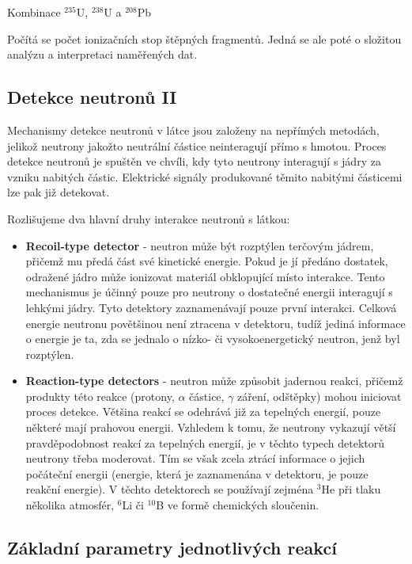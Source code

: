 \documentclass[../../main.tex]{subfiles}
\begin{document}
Kombinace $^{235}$U, $^{238}$U a $ ^{208}$Pb

Počítá se počet ionizačních stop štěpných fragmentů. Jedná se ale poté o složitou analýzu a interpretaci naměřených dat.

\subsection{Detekce neutronů II}
Mechanismy detekce neutronů v látce jsou založeny na nepřímých metodách, jelikož neutrony jakožto neutrální částice neinteragují přímo s hmotou. Proces detekce neutronů je spuštěn ve chvíli, kdy tyto neutrony interagují s jádry za vzniku nabitých částic. Elektrické signály produkované těmito nabitými částicemi lze pak již detekovat.

Rozlišujeme dva hlavní druhy interakce neutronů s látkou:
\begin{itemize}
	\item \textbf{Recoil-type detector} - neutron může být rozptýlen terčovým jádrem, přičemž mu předá část své kinetické energie. Pokud je jí předáno dostatek, odražené jádro může ionizovat materiál obklopující místo interakce. Tento mechanismus je účinný pouze pro neutrony o dostatečné energii interagují s lehkými jádry. Tyto detektory zaznamenávají pouze první interakci. Celková energie neutronu povětšinou není ztracena v detektoru, tudíž jediná informace o energie je ta, zda se jednalo o nízko- či vysokoenergetický neutron, jenž byl rozptýlen.
	
	\item \textbf{Reaction-type detectors} - neutron může způsobit jadernou reakci, přičemž produkty této reakce (protony, $\alpha$ částice, $\gamma$ záření, odštěpky) mohou iniciovat proces detekce. Většina reakcí se odehrává již za tepelných energií, pouze některé mají prahovou energii. Vzhledem k tomu, že neutrony vykazují větší pravděpodobnost reakcí za tepelných energií, je v těchto typech detektorů neutrony třeba moderovat. Tím se však zcela ztrácí informace o jejich počáteční energii (energie, která je zaznamenána v detektoru, je pouze reakční energie). V těchto detektorech se používají zejména $^{3}$He při tlaku několika atmosfér, $^{6}$Li či $^{10}$B ve formě chemických sloučenin. 
\end{itemize}

\subsection{Základní parametry jednotlivých reakcí}
\end{document}
